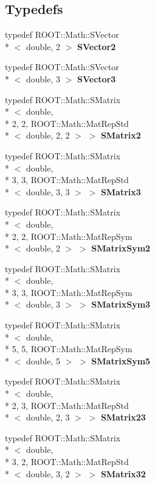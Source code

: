 \subsection*{Typedefs}
\begin{DoxyCompactItemize}
\item 
typedef R\-O\-O\-T\-::\-Math\-::\-S\-Vector\\*
$<$ double, 2 $>$ {\bf S\-Vector2}
\item 
typedef R\-O\-O\-T\-::\-Math\-::\-S\-Vector\\*
$<$ double, 3 $>$ {\bf S\-Vector3}
\item 
typedef R\-O\-O\-T\-::\-Math\-::\-S\-Matrix\\*
$<$ double, \\*
2, 2, R\-O\-O\-T\-::\-Math\-::\-Mat\-Rep\-Std\\*
$<$ double, 2, 2 $>$ $>$ {\bf S\-Matrix2}
\item 
typedef R\-O\-O\-T\-::\-Math\-::\-S\-Matrix\\*
$<$ double, \\*
3, 3, R\-O\-O\-T\-::\-Math\-::\-Mat\-Rep\-Std\\*
$<$ double, 3, 3 $>$ $>$ {\bf S\-Matrix3}
\item 
typedef R\-O\-O\-T\-::\-Math\-::\-S\-Matrix\\*
$<$ double, \\*
2, 2, R\-O\-O\-T\-::\-Math\-::\-Mat\-Rep\-Sym\\*
$<$ double, 2 $>$ $>$ {\bf S\-Matrix\-Sym2}
\item 
typedef R\-O\-O\-T\-::\-Math\-::\-S\-Matrix\\*
$<$ double, \\*
3, 3, R\-O\-O\-T\-::\-Math\-::\-Mat\-Rep\-Sym\\*
$<$ double, 3 $>$ $>$ {\bf S\-Matrix\-Sym3}
\item 
typedef R\-O\-O\-T\-::\-Math\-::\-S\-Matrix\\*
$<$ double, \\*
5, 5, R\-O\-O\-T\-::\-Math\-::\-Mat\-Rep\-Sym\\*
$<$ double, 5 $>$ $>$ {\bf S\-Matrix\-Sym5}
\item 
typedef R\-O\-O\-T\-::\-Math\-::\-S\-Matrix\\*
$<$ double, \\*
2, 3, R\-O\-O\-T\-::\-Math\-::\-Mat\-Rep\-Std\\*
$<$ double, 2, 3 $>$ $>$ {\bf S\-Matrix23}
\item 
typedef R\-O\-O\-T\-::\-Math\-::\-S\-Matrix\\*
$<$ double, \\*
3, 2, R\-O\-O\-T\-::\-Math\-::\-Mat\-Rep\-Std\\*
$<$ double, 3, 2 $>$ $>$ {\bf S\-Matrix32}
\end{DoxyCompactItemize}

